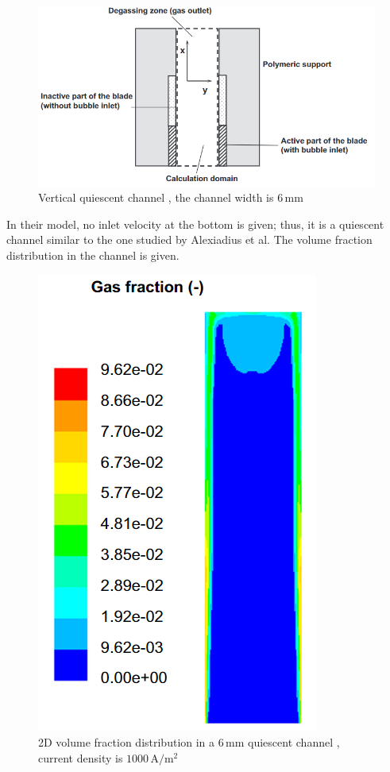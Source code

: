 \begin{figure}[H]
    \centering
    \includegraphics[scale=0.5]{lantern.png}
    \caption{Vertical quiescent channel \cite{abdelouahed2014hydrodynamics}, the channel width is $6 \, \mathrm{mm}$}
    \label{lantern}
\end{figure}

In their model, no inlet velocity at the bottom is given; thus, it is a quiescent channel similar to the one studied by Alexiadius et al. The volume fraction distribution in the channel is given.

\begin{figure}[H]
    \centering
    \includegraphics[scale=0.4]{volumedistribution.png}
    \caption{2D volume fraction distribution in a $6 \, \mathrm{mm}$ quiescent channel \cite{abdelouahed2014hydrodynamics}, current density is $1000 \, \mathrm{A/m^2}$ }
    \label{volumedistributionlag}
\end{figure}

